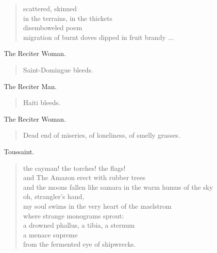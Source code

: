 \documentclass[letterpaper,article,12pt,oneside,notitlepage]{memoir}
\begin{document}
\begin{verse}
scattered, skinned \\
in the terrains, in the thickets \\
disemboweled poem \\
migration of burnt doves dipped in fruit brandy ... \\
\end{verse}

\begin{center}The Reciter Woman.\end{center}

\begin{verse}
Saint-Domingue bleeds. \\
\end{verse}

\begin{center}The Reciter Man.\end{center}

\begin{verse}
Haiti bleeds. \\
\end{verse}

\begin{center}The Reciter Woman.\end{center}

\begin{verse}
Dead end of miseries, of loneliness, of smelly grasses. \\
\end{verse}

\begin{center}Toussaint.\end{center}

\begin{verse}
the cayman! the torches! the flags! \\
and The Amazon erect with rubber trees \\
and the moons fallen like samara in the warm humus of the sky \\
oh, strangler's hand, \\
my soul swims in the very heart of the maelstrom \\
where strange monograms sprout: \\
a drowned phallus, a tibia, a sternum \\
a menace supreme \\
from the fermented eye of shipwrecks. \\
\end{verse}
\end{document}
